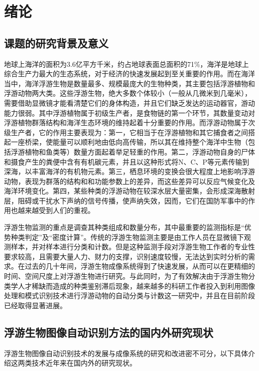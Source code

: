 \chapter{绪论}

\section{课题的研究背景及意义}

地球上海洋的面积为3.6亿平方千米，约占地球表面总面积的71\%，海洋是地球上综合生产力最大的生态系统，对于经济的快速发展起到至关重要的作用。而在海洋当中，海洋浮游生物是数量最多、规模最庞大的生物种类，其主要包括浮游植物和浮游动物两大类。这些浮游生物，绝大多数个体较小（一般从几微米到几毫米），需要借助显微镜才能看清楚它们的身体构造，并且它们缺乏发达的运动器官，游动能力很弱。其中浮游植物属于初级生产者，是食物链的第一个环节，其数量变动对浮游植物群落结构和海洋生态环境的维持起着十分重要的作用。而浮游动物属于次级生产者，它的作用主要表现为：第一，它相当于在浮游植物和其它捕食者之间搭起一座桥梁，使能量可以顺利地由低向高传输，所以其在维持整个海洋中生物（包括浮游植物和鱼类等）数量方面起着举足轻重的作用。第二，浮游动物自身的尸体和摄食产生的粪便中含有有机碳元素，并且以这种形式将N、C、P等元素传输到深海，以丰富海洋的有机物元素。第三，栖息环境的变换会很大程度上地影响浮游动物，表现为群落的结构和和功能参数上的差异，而这些差异可以反应气候变化及海洋环境变化。第四，某些种类的浮游动物在较深水层大量密集，会形成深海散射层，阻碍或干扰水下声纳的信号传播，使声纳失效，因而，它们在国防军事中的作用也越来越受到人们的重视。

浮游生物监测的重点是调查其种类组成和数量分布，其中最重要的监测指标是“优势种类判定”及“密度计算”。传统的浮游生物监测主要是由工作人员在显微镜下观测样本，并对样本进行分类和计数。但是这种监测手段对浮游生物工作者的专业性要求较高，且需要大量人力、财力的支撑，识别速度较慢，无法达到实时分析的需求。在过去的几十年间，浮游生物成像系统得到了快速发展，从而可以在更精细的时间、空间尺度上对浮游生物进行研究。与此同时，为了有效解决由于浮游生物分类学人才稀缺而造成的种类鉴别滞后现象，越来越多的科研工作者投入到利用图像处理和模式识别技术进行浮游动物的自动分类与计数这一研究中，并且在目前阶段已经取得显著进展。

\section{浮游生物图像自动识别方法的国内外研究现状}

浮游生物图像自动识别技术的发展与成像系统的研究和改进密不可分，以下具体介绍这两类技术近年来在国内外的研究现状。


